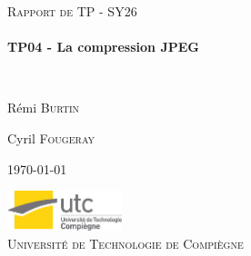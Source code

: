 \begin{titlepage}
\begin{center}



\textsc{\Large Rapport de TP - SY26}\\[0.5cm]
\vspace{4cm}
\HRule \\[0.4cm]
{ \huge \bfseries TP04 - La compression JPEG \\[0.4cm] }

\HRule \\[1.5cm]

\begin{minipage}{0.4\textwidth}
\begin{flushleft} \large
R\'emi \textsc{Burtin}
\end{flushleft}
\end{minipage}
\begin{minipage}{0.4\textwidth}
\begin{flushright} \large
Cyril \textsc{Fougeray}
\end{flushright}
\end{minipage}

\vspace{4cm}

{\large \today}



\vfill
\includegraphics[width=0.25\textwidth]{logo.jpg}\\[0.5cm]

\textsc{\LARGE Universit\'{e} de Technologie de Compi\`{e}gne}\\[1.5cm]


\end{center}
\end{titlepage}
